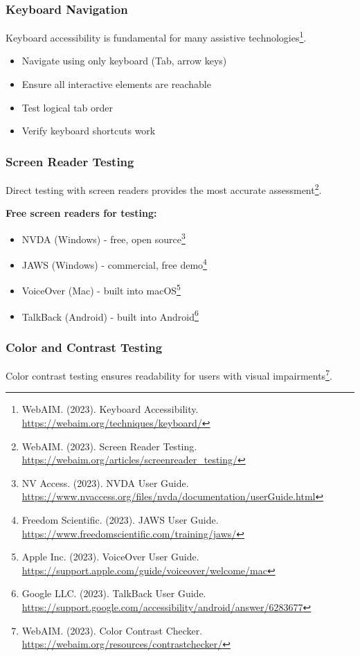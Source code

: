 \subsubsection{Keyboard Navigation}
Keyboard accessibility is fundamental for many assistive technologies\footnote{WebAIM. (2023). Keyboard Accessibility. \url{https://webaim.org/techniques/keyboard/}}.

\begin{itemize}
\item Navigate using only keyboard (Tab, arrow keys)
\item Ensure all interactive elements are reachable
\item Test logical tab order
\item Verify keyboard shortcuts work
\end{itemize}

\subsubsection{Screen Reader Testing}
Direct testing with screen readers provides the most accurate assessment\footnote{WebAIM. (2023). Screen Reader Testing. \url{https://webaim.org/articles/screenreader_testing/}}.

\textbf{Free screen readers for testing:}
\begin{itemize}
\item NVDA (Windows) - free, open source\footnote{NV Access. (2023). NVDA User Guide. \url{https://www.nvaccess.org/files/nvda/documentation/userGuide.html}}
\item JAWS (Windows) - commercial, free demo\footnote{Freedom Scientific. (2023). JAWS User Guide. \url{https://www.freedomscientific.com/training/jaws/}}
\item VoiceOver (Mac) - built into macOS\footnote{Apple Inc. (2023). VoiceOver User Guide. \url{https://support.apple.com/guide/voiceover/welcome/mac}}
\item TalkBack (Android) - built into Android\footnote{Google LLC. (2023). TalkBack User Guide. \url{https://support.google.com/accessibility/android/answer/6283677}}
\end{itemize}

\subsubsection{Color and Contrast Testing}
Color contrast testing ensures readability for users with visual impairments\footnote{WebAIM. (2023). Color Contrast Checker. \url{https://webaim.org/resources/contrastchecker/}}.

